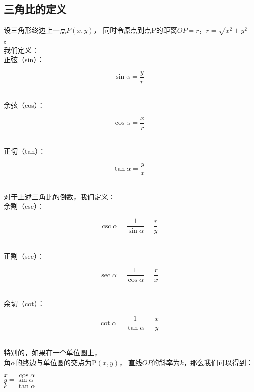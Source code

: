 \documentclass[UTF8]{ctexart}
\begin{document}
\newpage

\subsection{三角比的定义}
    设三角形终边上一点$P(x,y)$，
    同时令原点到点P的距离$OP=r$，$r=\sqrt{x^2+y^2}$。\\[3mm]
    我们定义：\\[3mm]
    正弦（sin）：
    \begin{large}
    \begin{equation*}
        \sin{\alpha}=\dfrac{y}{r}
    \end{equation*}   
    \end{large}\\
    余弦（cos）：
    \begin{large}
    \begin{equation*}
        \cos{\alpha}=\dfrac{x}{r}
    \end{equation*}   
    \end{large}\\
    正切（tan）：
    \begin{large}
    \begin{equation*}
        \tan{\alpha}=\dfrac{y}{x}
    \end{equation*}   
    \end{large}\\
    \newline
    对于上述三角比的倒数，我们定义：\\[3mm]
    余割（csc）：
    \begin{large}
    \begin{equation*}
        \csc{\alpha}=\dfrac{1}{\sin{\alpha}}=\dfrac{r}{y}
    \end{equation*}   
    \end{large}\\
    正割（sec）：
    \begin{large}
    \begin{equation*}
        \sec{\alpha}=\dfrac{1}{\cos{\alpha}}=\dfrac{r}{x}
    \end{equation*}   
    \end{large}\\
    余切（cot）：
    \begin{large}
    \begin{equation*}
        \cot{\alpha}=\dfrac{1}{\tan{\alpha}}=\dfrac{x}{y}
    \end{equation*}   
    \end{large}\\[3mm]
    特别的，如果在一个单位圆上，\\
    角$\alpha$的终边与单位圆的交点为P$(x,y)$，
    直线$OP$的斜率为$k$，那么我们可以得到：\\[5mm]
    \begin{large}
        $x=\cos{\alpha}$\\[4mm]
        $y=\sin{\alpha}$\\[4mm]
        $k=\tan{\alpha}$\\[4mm]
    \end{large}
\newpage
\end{document}
